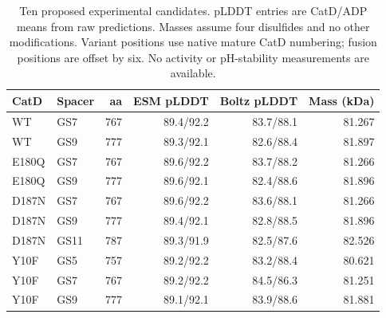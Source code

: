 \begin{table}[t]
\centering
\small
\caption{Ten proposed experimental candidates. pLDDT entries are CatD/ADP means from raw predictions. Masses assume four disulfides and no other modifications. Variant positions use native mature CatD numbering; fusion positions are offset by six. No activity or pH-stability measurements are available.}
\label{tab:panel}
\begin{tabular}{llrrrr}
\toprule
CatD & Spacer & aa & ESM pLDDT & Boltz pLDDT & Mass (kDa) \\
\midrule
WT & GS7 & 767 & 89.4/92.2 & 83.7/88.1 & 81.267 \\
WT & GS9 & 777 & 89.3/92.1 & 82.6/88.4 & 81.897 \\
E180Q & GS7 & 767 & 89.6/92.2 & 83.7/88.2 & 81.266 \\
E180Q & GS9 & 777 & 89.6/92.1 & 82.4/88.6 & 81.896 \\
D187N & GS7 & 767 & 89.6/92.2 & 83.6/88.1 & 81.266 \\
D187N & GS9 & 777 & 89.4/92.1 & 82.8/88.5 & 81.896 \\
D187N & GS11 & 787 & 89.3/91.9 & 82.5/87.6 & 82.526 \\
Y10F & GS5 & 757 & 89.2/92.2 & 83.2/88.4 & 80.621 \\
Y10F & GS7 & 767 & 89.2/92.2 & 84.5/86.3 & 81.251 \\
Y10F & GS9 & 777 & 89.1/92.1 & 83.9/88.6 & 81.881 \\
\bottomrule
\end{tabular}
\end{table}
